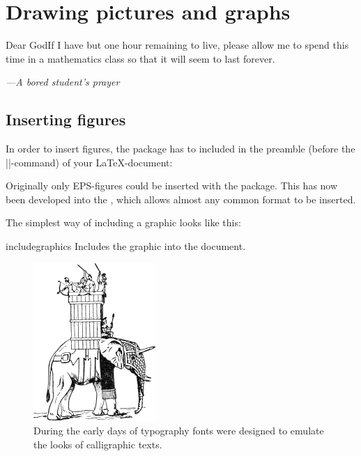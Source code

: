 \newcommand\addcredit[1]{%
 \bgroup
 \vspace*{-6.5pt}
 \scriptsize%
  \tcbox[colframe=white,
        colback=white,
        size=minimal, 
        nobeforeafter,
        minipage,
        boxsep=0pt,
        top=0pt, 
        bottom=0pt,
        shrink tight,
        right=0pt,left=0pt]{\hfill\hfill\textit{Credit: #1}}%
 \egroup
}


\chapter{Drawing pictures and graphs}

\epigraph{Dear God\break If I have but one hour remaining to live, please allow me to spend this time
in a mathematics class so that it will seem to last forever.}{\textit{---A bored student's prayer}}





\section{Inserting figures}

In order to insert figures, the  package has to included in the preamble (before the ||-command) of your LaTeX-document:

\begin{dispListing}
\usepackage{graphicx}
\end{dispListing}

Originally only EPS-figures could be inserted with the package. This has now been developed into the  , which allows almost any common format to be inserted. 

The simplest way of including a graphic looks like this:


\begin{docCommand}{includegraphics}{ }{}
Includes the graphic into the document.
\end{docCommand}

\begin{figure}[htbp]%
  \centering
  \includegraphics[width=0.3\linewidth]{./graphics/pic37.png}
  \caption{During the early days of typography fonts were designed to emulate the looks of calligraphic texts.}
  \label{fig:marginfig1}
\end{figure}

